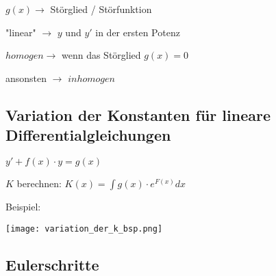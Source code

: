 \begin{multicols*}{3}
    {$g(x) \rightarrow$ Störglied / Störfunktion}

    { "linear" $\rightarrow$ $y$ und $y'$ in der ersten Potenz}

    { $homogen \rightarrow$ wenn das Störglied  $g(x)=0$}

    { ansonsten $\rightarrow$ $inhomogen$}

    \subsection{ Variation der Konstanten für lineare Differentialgleichungen}


    {       $y' + f(x) \cdot y = g(x)$}



     {$K$ berechnen: \large $K(x) = \int g(x) \cdot e^{F(x)} dx $}





    {Beispiel:}

    \texttt{[image: variation\_der\_k\_bsp.png]}




    \subsection{ Eulerschritte}
    \WhiteSpace

    \mbox{}

\end{multicols*}


